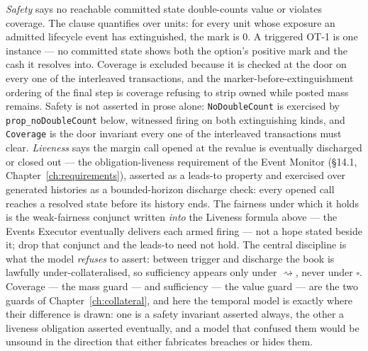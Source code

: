\emph{Safety} says no reachable committed state double-counts value or violates coverage.
The clause quantifies over units: for every unit whose exposure an admitted lifecycle event
has extinguished, the mark is $0$. A triggered OT-1 is one instance --- no committed state
shows both the option's positive mark and the  cash it resolves into. Coverage
is excluded because it is checked at the door on every one of the interleaved transactions,
and the marker-before-extinguishment ordering of the final step is coverage refusing to
strip owned while posted mass remains. Safety is not asserted in prose alone: \texttt{NoDoubleCount} is exercised by
\texttt{prop\_noDoubleCount} below, witnessed firing on both extinguishing kinds, and
\texttt{Coverage} is the door invariant every one of the interleaved transactions must clear.
\emph{Liveness} says the margin call opened at the revalue is eventually discharged or closed
out --- the obligation-liveness requirement of the Event Monitor (\S 14.1,
Chapter~\ref{ch:requirements}), asserted as a leads-to property and exercised over generated
histories as a bounded-horizon discharge check: every opened call reaches a resolved state
before its history ends. The fairness under which it holds is the weak-fairness conjunct
written \emph{into} the Liveness formula above --- the Events Executor eventually delivers each
armed firing --- not a hope stated beside it; drop that conjunct and the leads-to need not
hold. The central discipline is what the model \emph{refuses} to assert: between trigger and
discharge the book is lawfully under-collateralised, so sufficiency appears only under
$\rightsquigarrow$, never under $\square$. Coverage --- the mass guard --- and sufficiency ---
the value guard --- are the two guards of Chapter~\ref{ch:collateral}, and here the temporal
model is exactly where their difference is drawn: one is a safety invariant asserted always,
the other a liveness obligation asserted eventually, and a model that confused them would be
unsound in the direction that either fabricates breaches or hides them.

